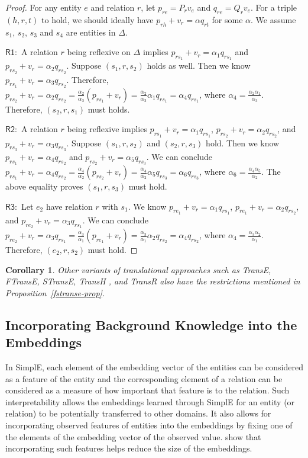 \documentclass{article}
\newcommand{\triple}[3]{(\mathit{#1}, \mathit{#2}, \mathit{#3})}
\newtheorem{corollary}{Corollary}
\begin{document}
\begin{proof}
For any entity $e$ and relation $r$, let $p_{re} = P_r v_e$ and $q_{re}=Q_r v_e$. For a triple $\triple{h}{r}{t}$ to hold, we should ideally have $p_{rh} + v_r = \alpha q_{rt}$ for some $\alpha$. We assume $s_1$, $s_2$, $s_3$ and $s_4$ are entities in $\Delta$.

$\mathsf{R1:}$ A relation $r$ being reflexive on $\Delta$ implies $p_{rs_1}+v_r=\alpha_1 q_{rs_1}$ and $p_{rs_2} + v_r = \alpha_2 q_{rs_2}$. Suppose $\triple{s_1}{r}{s_2}$ holds as well. Then we know $p_{rs_1} + v_r = \alpha_3 q_{rs_2}$. Therefore, $p_{rs_2} + v_r = \alpha_2 q_{rs_2} = \frac{\alpha_2}{\alpha_3} (p_{rs_1} + v_r) = \frac{\alpha_2}{\alpha_3} \alpha_1 q_{rs_1} = \alpha_4 q_{rs_1}$, where $\alpha_4 = \frac{\alpha_2 \alpha_1}{\alpha_3}$.
Therefore, $\triple{s_2}{r}{s_1}$ must holds.

$\mathsf{R2:}$ A relation $r$ being reflexive implies $p_{rs_1}+v_r=\alpha_1 q_{rs_1}$, $p_{rs_2}+v_r=\alpha_2 q_{rs_2}$, and $p_{rs_3}+v_r=\alpha_3 q_{rs_3}$. Suppose $\triple{s_1}{r}{s_2}$ and $\triple{s_2}{r}{s_3}$ hold. Then we know $p_{rs_1} + v_r = \alpha_4 q_{rs_2}$ and $p_{rs_2} + v_r = \alpha_5 q_{rs_3}$. We can conclude $p_{rs_1} + v_r = \alpha_4 q_{rs_2} = \frac{\alpha_4}{\alpha_2} (p_{rs_2} + v_r) = \frac{\alpha_4}{\alpha_2} \alpha_5 q_{rs_3} = \alpha_6 q_{rs_3}$, where $\alpha_6 = \frac{\alpha_4 \alpha_5}{\alpha_2}$. The above equality proves $\triple{s_1}{r}{s_3}$ must hold.

$\mathsf{R3:}$ Let $e_2$ have relation $r$ with $s_1$. We know $p_{re_1} + v_r = \alpha_1 q_{rs_1}$, $p_{re_1} + v_r = \alpha_2 q_{rs_2}$, and $p_{re_2} + v_r = \alpha_3 q_{rs_1}$. We can conclude $p_{re_2} + v_r = \alpha_3 q_{rs_1} =  \frac{\alpha_3}{\alpha_1} (p_{re_1} + v_r) = \frac{\alpha_3}{\alpha_1} \alpha_2 q_{rs_2} = \alpha_4 q_{rs_2}$, where $\alpha_4 = \frac{\alpha_3 \alpha_2}{\alpha_1}$. Therefore, $\triple{e_2}{r}{s_2}$ must hold.
\end{proof}

\begin{corollary}
Other variants of translational approaches such as TransE, FTransE, STransE, TransH \cite{wang2014knowledge}, and TransR \cite{lin2015learning} also have the restrictions mentioned in Proposition~\ref{fstranse-prop}.
\end{corollary}

\subsection{Incorporating Background Knowledge into the Embeddings} \label{expert-subsection}
In SimplE, each element of the embedding vector of the entities can be considered as a feature of the entity and the corresponding element of a relation can be considered as a measure of how important that feature is to the relation. Such interpretability allows the embeddings learned through SimplE for an entity (or relation) to be potentially transferred to other domains. It also allows for incorporating observed features of entities into the embeddings by fixing one of the elements of the embedding vector of the observed value. \citet{nickel2014reducing} show that incorporating such features helps reduce the size of the embeddings.
 
\end{document}
